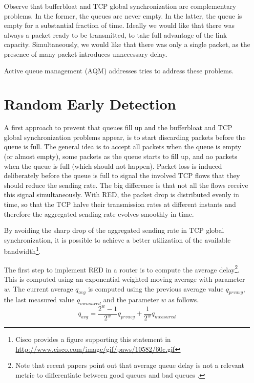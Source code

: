 Observe that bufferbloat and TCP global synchronization are complementary problems.
In the former, the queues are never empty.
In the latter, the queue is empty for a substantial fraction of time.
Ideally we would like that there was always a packet ready to be transmitted, to take full advantage of the link capacity.
Simultaneously, we would like that there was only a single packet, as the presence of many packet introduces unnecessary delay.

Active queue management (AQM) addresses tries to address these problems.

\section{Random Early Detection}

A first approach to prevent that queues fill up and the bufferbloat and TCP global synchronization problems appear, is to start discarding packets before the queue is full.
The general idea is to accept all packets when the queue is empty (or almost empty), some packets as the queue starts to fill up, and no packets when the queue is full (which should not happen).
Packet loss is induced deliberately before the queue is full to signal the involved TCP flows that they should reduce the sending rate.
The big difference is that not all the flows receive this signal simultaneously.
With RED, the packet drop is distributed evenly in time, so that the TCP halve their transmission rates at different instants and therefore the aggregated sending rate evolves smoothly in time.

By avoiding the sharp drop of the aggregated sending rate in TCP global synchronization, it is possible to achieve a better utilization of the available bandwidth\footnote{Cisco provides a figure supporting this statement in \url{http://www.cisco.com/image/gif/paws/10582/60c.gif}}.


The first step to implement RED in a router is to compute the average delay\footnote{Note that recent papers point out that average queue delay is not a relevant metric to differentiate between good queues and bad queues \cite{nichols2012cqd}.}.
This is computed using an exponential weighted moving average with parameter $w$.
The current average $q_{avg}$ is computed using the previous average value $q_{prvavg}$, the last measured value $q_{measured}$ and the parameter $w$ as follows.
\begin{equation}
q_{avg} = \frac{2^w-1}{2^w}q_{prvavg} + \frac{1}{2^w}q_{measured}
\end{equation}

